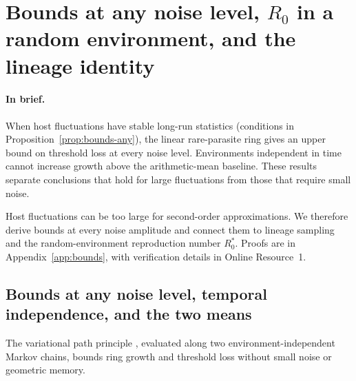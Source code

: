 \section{Bounds at any noise level, \texorpdfstring{$R_0$}{R0} in a random environment, and the lineage identity}\label{sec:bounds}

\paragraph{In brief.}
When host fluctuations have stable long-run statistics (conditions in Proposition~\ref{prop:bounds-any}), the linear rare-parasite ring gives an upper bound on threshold loss at every noise level. Environments independent in time cannot increase growth above the arithmetic-mean baseline. These results separate conclusions that hold for large fluctuations from those that require small noise.

Host fluctuations can be too large for second-order approximations. We therefore derive bounds at every noise amplitude and connect them to lineage sampling and the random-environment reproduction number $R_0^*$. Proofs are in Appendix~\ref{app:bounds}, with verification details in Online Resource~1.

\subsection{Bounds at any noise level, temporal independence, and the two means}\label{subsec:bounds-any}

The variational path principle \citep{dombry2011,kobayashi2017,sughiyama2019}, evaluated along two environment-independent Markov chains, bounds ring growth and threshold loss without small noise or geometric memory.

